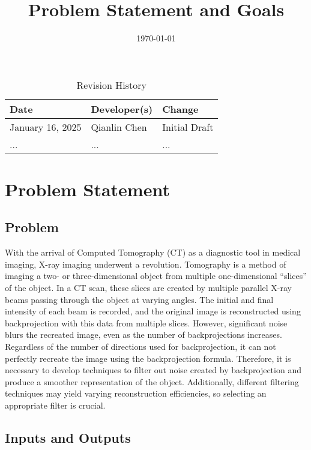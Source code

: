 \documentclass{article}
\title{Problem Statement and Goals\\\progname}
\author{\authname}
\date{\today}
\begin{document}
\maketitle

\begin{table}[hp]
\caption{Revision History} \label{TblRevisionHistory}
\begin{tabularx}{\textwidth}{llX}
\toprule
\textbf{Date} & \textbf{Developer(s)} & \textbf{Change}\\
\midrule
  January 16, 2025 & Qianlin Chen & Initial Draft \\
\midrule
  ... & ... & ...\\
\bottomrule
\end{tabularx}
\end{table}

\section{Problem Statement}

\subsection{Problem}
With the arrival of Computed Tomography (CT) as a diagnostic tool in medical
imaging, X-ray imaging underwent a revolution. Tomography is a method of imaging
a two- or three-dimensional object from multiple one-dimensional ``slices'' of
the object. In a CT scan, these slices are created by multiple parallel X-ray
beams passing through the object at varying angles. The initial and final
intensity of each beam is recorded, and the original image is reconstructed
using backprojection with this data from multiple slices.
\newline However, significant noise blurs the recreated image, even as the number of
backprojections increases. Regardless of the number of directions used for
backprojection, it can not perfectly recreate the image using the backprojection
formula\cite{Beatty2012}. Therefore, it is necessary to develop techniques to filter out noise
created by backprojection and produce a smoother representation of the object.
Additionally, different filtering techniques may yield varying reconstruction
efficiencies, so selecting an appropriate filter is crucial.

\subsection{Inputs and Outputs}
\end{document}
